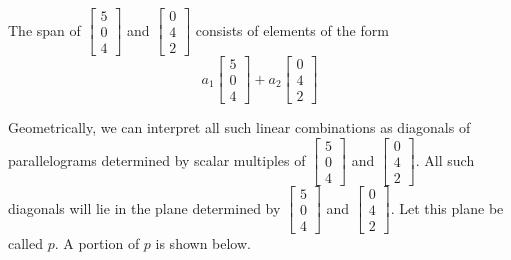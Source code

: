 \documentclass{ximera}
\begin{document}
\begin{example}
\begin{explanation}
The span of $\begin{bmatrix}5\\0\\4\end{bmatrix}$ and $\begin{bmatrix}0\\4\\2\end{bmatrix}$ consists of elements of the form
$$a_1\begin{bmatrix}5\\0\\4\end{bmatrix}+a_2\begin{bmatrix}0\\4\\2\end{bmatrix}$$

Geometrically, we can interpret all such linear combinations as diagonals of parallelograms determined by scalar multiples of $\begin{bmatrix}5\\0\\4\end{bmatrix}$ and $\begin{bmatrix}0\\4\\2\end{bmatrix}$.  All such diagonals will lie in the plane determined by $\begin{bmatrix}5\\0\\4\end{bmatrix}$ and $\begin{bmatrix}0\\4\\2\end{bmatrix}$.  Let this plane be called $p$.  A portion of $p$ is shown below.
\begin{image}
\end{image}


\end{explanation}
\end{example}
\end{document}
